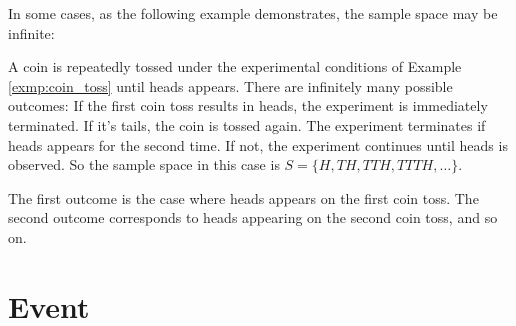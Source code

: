 In some cases, as the following example demonstrates, the sample space may be infinite:

\begin{exmp}\label{exmp:heads_observe}
	A coin is repeatedly tossed under the experimental conditions of Example \autoref{exmp:coin_toss} until heads appears.
	There are infinitely many possible outcomes:
	If the first coin toss results in heads, the experiment is immediately terminated.
	If it's tails, the coin is tossed again.
	The experiment terminates if heads appears for the second time.
	If not, the experiment continues until heads is observed.
	So the sample space in this case is \( S = \{ H, TH, TTH, TTTH, \ldots \} \).

	The first outcome is the case where heads appears on the first coin toss.
	The second outcome corresponds to heads appearing on the second coin toss, and so on.
\end{exmp}

\section{Event}

